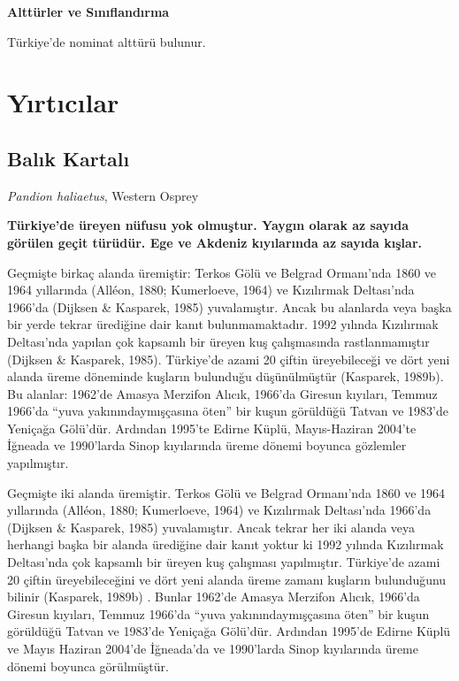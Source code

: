 \documentclass[
  a4paper,
  DIV=11,
  numbers=noendperiod]{scrreprt}
\begin{document}
\textbf{Alttürler ve Sınıflandırma}

Türkiye'de nominat alttürü bulunur.


\chapter{Yırtıcılar}\label{yux131rtux131cux131lar}

\section{Balık Kartalı}\label{balux131k-kartalux131}

\emph{Pandion haliaetus}, Western Osprey

\textbf{Türkiye'de üreyen nüfusu yok olmuştur. Yaygın olarak az sayıda
görülen geçit türüdür. Ege ve Akdeniz kıyılarında az sayıda kışlar.}

Geçmişte birkaç alanda üremiştir: Terkos Gölü ve Belgrad Ormanı'nda 1860
ve 1964 yıllarında (Alléon, 1880; Kumerloeve, 1964) ve Kızılırmak
Deltası'nda 1966'da (Dijksen \& Kasparek, 1985) yuvalamıştır. Ancak bu
alanlarda veya başka bir yerde tekrar ürediğine dair kanıt
bulunmamaktadır. 1992 yılında Kızılırmak Deltası'nda yapılan çok
kapsamlı bir üreyen kuş çalışmasında rastlanmamıştır (Dijksen \&
Kasparek, 1985). Türkiye'de azami 20 çiftin üreyebileceği ve dört yeni
alanda üreme döneminde kuşların bulunduğu düşünülmüştür (Kasparek,
1989b). Bu alanlar: 1962'de Amasya Merzifon Alıcık, 1966'da Giresun
kıyıları, Temmuz 1966'da ``yuva yakınındaymışçasına öten'' bir kuşun
görüldüğü Tatvan ve 1983'de Yeniçağa Gölü'dür. Ardından 1995'te Edirne
Küplü, Mayıs-Haziran 2004'te İğneada ve 1990'larda Sinop kıyılarında
üreme dönemi boyunca gözlemler yapılmıştır.

Geçmişte iki alanda üremiştir. Terkos Gölü ve Belgrad Ormanı'nda 1860 ve
1964 yıllarında (Alléon, 1880; Kumerloeve, 1964) ve Kızılırmak
Deltası'nda 1966'da (Dijksen \& Kasparek, 1985) yuvalamıştır. Ancak
tekrar her iki alanda veya herhangi başka bir alanda ürediğine dair
kanıt yoktur ki 1992 yılında Kızılırmak Deltası'nda çok kapsamlı bir
üreyen kuş çalışması yapılmıştır. Türkiye'de azami 20 çiftin
üreyebileceğini ve dört yeni alanda üreme zamanı kuşların bulunduğunu
bilinir (Kasparek, 1989b) . Bunlar 1962'de Amasya Merzifon Alıcık,
1966'da Giresun kıyıları, Temmuz 1966'da ``yuva yakınındaymışçasına
öten'' bir kuşun görüldüğü Tatvan ve 1983'de Yeniçağa Gölü'dür. Ardından
1995'de Edirne Küplü ve Mayıs Haziran 2004'de İğneada'da ve 1990'larda
Sinop kıyılarında üreme dönemi boyunca görülmüştür.
\end{document}
